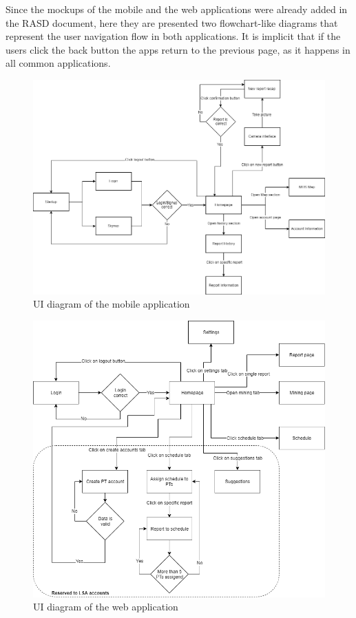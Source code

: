 Since the mockups of the mobile and the web applications were already added in the RASD document, here they are presented two flowchart-like diagrams that represent the user navigation flow in both applications. It is implicit that if the users click the back button the apps return to the previous page, as it happens in all common applications.

\vfill

\begin{figure}[H]
  \centering
  \includegraphics[width=1\textwidth]{Images/UI_Mobile_App.png}
  \caption{UI diagram of the mobile application}
  \label{fig:ui_mobile_app}
\end{figure}

\vfill
\newpage
\null
\vfill

\begin{figure}[H]
  \centering
  \includegraphics[width=1\textwidth]{Images/UI_Web_App.png}
  \caption{UI diagram of the web application}
  \label{fig:ui_web_app}
\end{figure}


\vfill
\newpage
